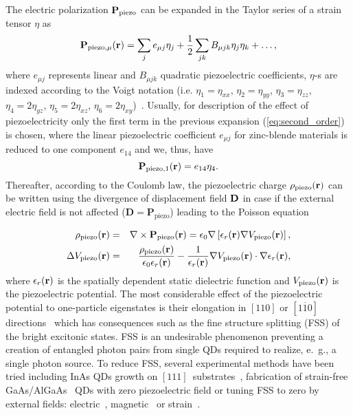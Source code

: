 The electric polarization $\mathbf{P}_{{\rm piezo}}$ can be expanded in the Taylor series of a strain tensor $\eta$ as
\begin{equation}
\mathbf{P}_{{\rm piezo},\mu}(\mathbf{r})=%
\sum_je_{\mu j}\eta_j+\frac{1}{2}\sum_{jk}B_{\mu jk}\eta_j\eta_k+\dots ,\label{eq:second_order}
\end{equation}
where $e_{\mu j}$ represents linear and $B_{\mu jk}$ quadratic piezoelectric coefficients, $\eta$-s are indexed according to the Voigt notation (i.e. $\eta_1=\eta_{xx}$, $\eta_2=\eta_{yy}$, $\eta_3=\eta_{zz}$, $\eta_4=2\eta_{yz}$, $\eta_5=2\eta_{xz}$, $\eta_6=2\eta_{xy}$)~\citep{voigt_notation, Beya-Wakata2011}. 
Usually, for description of the effect of piezoelectricity only the first term in the previous expansion (\ref{eq:second_order}) is chosen, where the linear piezoelectric coefficient $e_{\mu j}$ for zinc-blende materials is reduced to one component $e_{14}$ and we, thus, have
\begin{equation}
\mathbf{P}_{{\rm piezo},1}(\mathbf{r})=%
e_{14 }\eta_4 \label{eq:first_order}.
\end{equation}
%
Thereafter, according to the Coulomb law, the piezoelectric charge $\rho_{\rm piezo}(\bf{r})$ can be written using the divergence of displacement field $\bf{ D}$ in case if the external electric field is not affected ($\mathbf{D}=\mathbf{P}_\mathrm{piezo}$) leading to the Poisson equation

\begin{eqnarray}
\rho_{\rm piezo}(\mathbf{r})&=&\nabla\times\mathbf{P}_{\rm piezo}(\mathbf{r})=\epsilon_0\nabla\left[\epsilon_r(\mathbf{r})\nabla V_{\rm piezo}(\mathbf{r})\right],\\
\Delta V_{\rm piezo}(\mathbf{r})&=&\frac{\rho_{\rm piezo}(\mathbf{r})}{\epsilon_0\epsilon_r(\mathbf{r})}-\frac{1}{\epsilon_r(\mathbf{r})}\nabla V_{\rm piezo}(\mathbf{r})\cdot\nabla\epsilon_r(\mathbf{r}),
\end{eqnarray}
%
where $\epsilon_r(\bf{r})$ is the spatially dependent static dielectric function and $V_{\rm piezo}(\bf{r})$ is the piezoelectric potential. The most considerable effect of the piezoelectric potential to one-particle eigenstates is their elongation in $[110]$ or $[1\overline{1}0]$ directions~\citep{Stier1999} which has consequences such as the fine structure splitting (FSS) of the bright excitonic states. FSS is an undesirable phenomenon preventing a creation of entangled photon pairs from single QDs required to realize, e.~g., a single photon source. To reduce FSS, several experimental methods have been tried including InAs QDs growth on $[111]$~substrates~\citep{StockFSS}, fabrication of strain-free GaAs/AlGaAs~\citep{Abbarchi_2008} QDs with zero piezoelectric field or tuning FSS to zero by external fields: electric~\citep{Gerardot_2007, Vogel_2007}, magnetic~\citep{Stevenson_2006} or strain~\citep{kleDresden}. 

